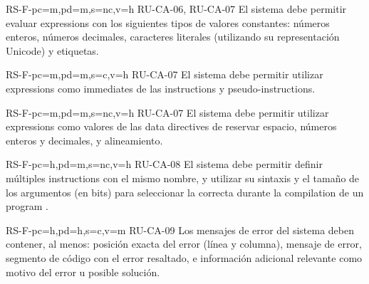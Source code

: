 \begin{softwareReq}{RS-F-}{pc=m,pd=m,s=nc,v=h}
    {RU-CA-06, RU-CA-07}
    El sistema debe permitir evaluar \glspl{expression} con los siguientes tipos
    de valores constantes: números enteros, números decimales, caracteres
    literales (utilizando su representación Unicode) y etiquetas.
\end{softwareReq}

\begin{softwareReq}{RS-F-}{pc=m,pd=m,s=c,v=h}
    {RU-CA-07}
    El sistema debe permitir utilizar \glspl{expression} como \glspl{immediate}
    de las \glspl{instruction} y \glspl{pseudo-instruction}.
\end{softwareReq}

\begin{softwareReq}{RS-F-}{pc=m,pd=m,s=nc,v=h}
    {RU-CA-07}
    El sistema debe permitir utilizar \glspl{expression} como valores de las
    \glspl{data directive} de reservar espacio, números enteros y decimales, y
    alineamiento.
\end{softwareReq}

\begin{softwareReq}{RS-F-}{pc=h,pd=m,s=nc,v=h}
    {RU-CA-08}
    El sistema debe permitir definir múltiples \glspl{instruction} con el mismo
    nombre, y utilizar su sintaxis y el tamaño de los argumentos (en bits) para
    seleccionar la correcta durante la \gls{compilation} de un \gls{program}
    .
\end{softwareReq}

\begin{softwareReq}{RS-F-}{pc=h,pd=h,s=c,v=m}
    {RU-CA-09}
    Los mensajes de error del sistema deben contener, al menos: posición exacta
    del error (línea y columna), mensaje de error, segmento de código con el
    error resaltado, e información adicional relevante como motivo del error u
    posible solución.
\end{softwareReq}


